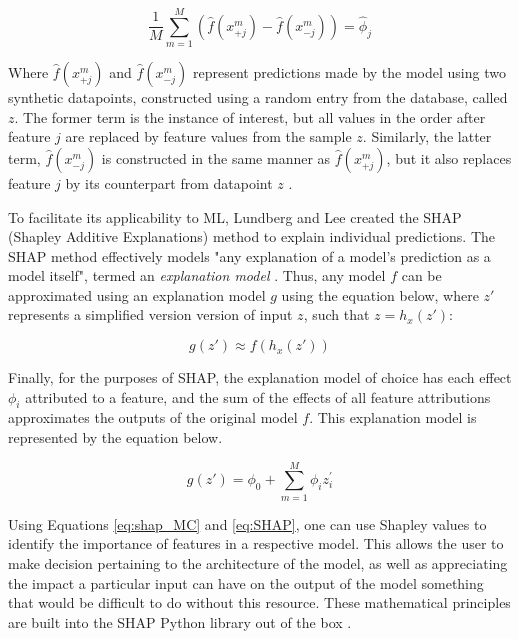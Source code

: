 \documentclass[main.tex]{subfiles}
\begin{document}
\begin{equation} \label{eq:shap_MC}
	\frac{1}{M}\sum_{m=1}^{M} (\hat{f}(x^{m}_{+j})-\hat{f}(x^{m}_{-j})) = \hat{\phi}_{j}
\end{equation}

Where $\hat{f}(x^{m}_{+j})$ and $\hat{f}(x^{m}_{-j})$ represent predictions made by the model using two synthetic datapoints, constructed using a random entry from the database, called $z$. The former term is the instance of interest, but all values in the order after feature $j$ are replaced by feature values from the sample $z$. Similarly, the latter term, $\hat{f}(x^{m}_{-j})$ is constructed in the same manner as $\hat{f}(x^{m}_{+j})$, but it also replaces feature $j$ by its counterpart from datapoint $z$ \cite{Molnar2021}. 

To facilitate its applicability to ML, Lundberg and Lee created the SHAP (Shapley Additive Explanations) method to explain individual predictions. The SHAP method effectively models "any explanation of a model's prediction as a model itself", termed an \emph{explanation model} \cite{NIPS2017_8a20a862}. Thus, any model $f$ can be approximated using an explanation model $g$ using the equation below, where $z'$ represents a simplified version version of input $z$, such that $z = h_{x}(z')$:

\begin{equation}
	g(z')\approx f(h_{x}(z'))
\end{equation}

Finally, for the purposes of SHAP, the explanation model of choice has each effect $\phi_{i}$ attributed to a feature, and the sum of the effects of all feature attributions approximates the outputs of the original model $f$. This explanation model is represented by the equation below.

\begin{equation} \label{eq:SHAP}
	g(z') = \phi_{0} + \sum_{m=1}^{M} \phi_{i}z_{i}^{'}
\end{equation}

Using Equations \ref{eq:shap_MC} and \ref{eq:SHAP}, one can use Shapley values to identify the importance of features in a respective model. This allows the user to make decision pertaining to the architecture of the model, as well as appreciating the impact a particular input can have on the output of the model \textemdash something that would be difficult to do without this resource. These mathematical principles are built into the SHAP Python library out of the box \cite{NIPS2017_8a20a862}.
\end{document}
